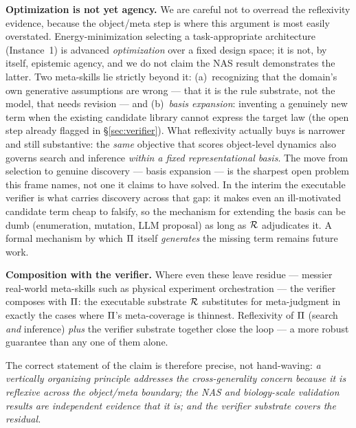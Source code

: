 \textbf{Optimization is not yet agency.} We are careful not to overread the reflexivity evidence, because the object/meta step is where this argument is most easily overstated. Energy-minimization selecting a task-appropriate architecture (Instance~1) is advanced \emph{optimization} over a fixed design space; it is not, by itself, epistemic agency, and we do not claim the NAS result demonstrates the latter. Two meta-skills lie strictly beyond it: (a)~recognizing that the domain's own generative assumptions are wrong --- that it is the rule substrate, not the model, that needs revision --- and (b)~\emph{basis expansion}: inventing a genuinely new term when the existing candidate library cannot express the target law (the open step already flagged in \S\ref{sec:verifier}). What reflexivity actually buys is narrower and still substantive: the \emph{same} objective that scores object-level dynamics also governs search and inference \emph{within a fixed representational basis}. The move from selection to genuine discovery --- basis expansion --- is the sharpest open problem this frame names, not one it claims to have solved. In the interim the executable verifier is what carries discovery across that gap: it makes even an ill-motivated candidate term cheap to falsify, so the mechanism for extending the basis can be dumb (enumeration, mutation, LLM proposal) as long as $\mathcal{R}$ adjudicates it. A formal mechanism by which $\Pi$ itself \emph{generates} the missing term remains future work.

\textbf{Composition with the verifier.} Where even these leave residue --- messier real-world meta-skills such as physical experiment orchestration --- the verifier composes with $\Pi$: the executable substrate $\mathcal{R}$ substitutes for meta-judgment in exactly the cases where $\Pi$'s meta-coverage is thinnest. Reflexivity of $\Pi$ (search \emph{and} inference) \emph{plus} the verifier substrate together close the loop --- a more robust guarantee than any one of them alone.

The correct statement of the claim is therefore precise, not hand-waving: \emph{a vertically organizing principle addresses the cross-generality concern because it is reflexive across the object/meta boundary; the NAS \citep{frasch2026c} and biology-scale validation \citep{frasch2026d} results are independent evidence that it is; and the verifier substrate covers the residual.}
